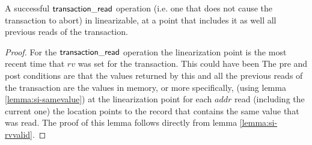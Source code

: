 \begin{lemma}
\label{lemma:si-tread}
A successful $\sf{transaction\_read}$ operation (i.e. one that does not cause the transaction to abort) in linearizable,
at a point that includes it as well all previous reads of the transaction.
\end{lemma}
\begin{proof}
For the $\sf{transaction\_read}$ operation the linearization point is the most recent time that $\mathit{rv}$ was set for the transaction.
This could have been 
The pre and post conditions are that the values returned by this and all the previous reads of the transaction are the values in memory, or more specifically, 
(using lemma \ref{lemma:si-samevalue}) at the linearization point for each $\mathit{addr}$ read (including the current one) the location points to the record
that contains the same value that was read.
The proof of this lemma follows directly from lemma \ref{lemma:si-rvvalid}.
\end{proof}


